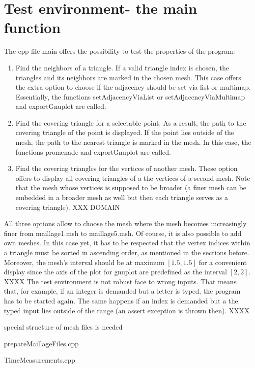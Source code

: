 \documentclass[10pt]{article}
\begin{document}
\section{Test environment- the main function}
	The cpp file main offers the possibility to test the properties of the program:
	\begin{enumerate}
		\item 
		Find the neighbors of a triangle.
		If a valid triangle index is chosen, the triangles and its neighbors are marked in the chosen mesh. This case offers the extra option to choose if the adjacency should be set via list or multimap. Essentially, the functions 
		{\ttfamily setAdjacencyViaList } or {\ttfamily setAdjacencyViaMultimap} and {\ttfamily exportGnuplot} are called. 
		\item 
		Find the covering triangle for a selectable point. 
		As a result, the path to the covering triangle of the point is displayed. 
		If the point lies outside of the mesh, the path to the nearest triangle is marked in the mesh. 
		In this case, the functions {\ttfamily promenade} and {\ttfamily exportGnuplot} are called. 
		\item 
		Find the covering triangles for the vertices of another mesh. These option offers to display all covering triangles of a the vertices of a second mesh. Note that the mesh whose vertices is supposed to be broader (a finer mesh can be embedded in a broader mesh as well but then each triangle serves as a covering triangle). XXX DOMAIN
	\end{enumerate}
	All three options allow to choose the mesh where the mesh becomes increasingly finer from maillage1.msh to maillage5.msh. 
	Of course, it is also possible to add own meshes. In this case yet, it has to be respected that the vertex indices within a triangle must be sorted in ascending order, as mentioned in the sections before. 
	Moreover, the mesh's interval should be at maximum $ [1.5,1.5] $ for a convenient display since the axis of the plot for gnuplot are predefined as the interval $ [2,2] $.  \\
	XXXX
	The test environment is not robust face to wrong inputs. That means that, for example, if an integer is demanded but a letter is typed, the program has to be started again. The same happens if an index is demanded but a the typed input lies outside of the range (an assert exception is thrown then).  
	XXXX
	
	special structure of mesh files is needed
	
	prepareMaillageFiles.cpp
	
	TimeMeasurements.cpp
	
\end{document}
